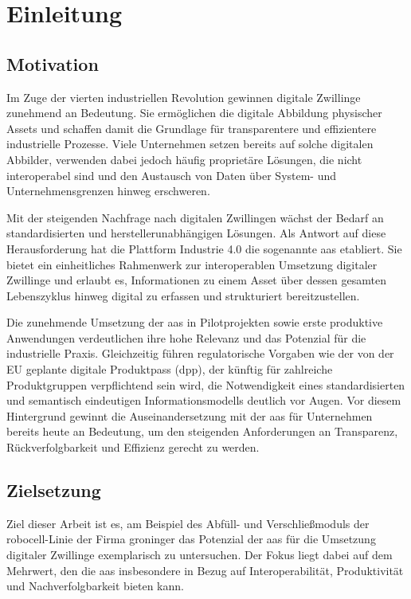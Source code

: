 \thispagestyle{fancy}
\section{Einleitung}
\subsection{Motivation}
\label{sec:Motivation}
Im Zuge der vierten industriellen Revolution gewinnen digitale Zwillinge zunehmend an Bedeutung. 
Sie ermöglichen die digitale Abbildung physischer Assets und schaffen damit die Grundlage für transparentere und effizientere industrielle Prozesse. 
Viele Unternehmen setzen bereits auf solche digitalen Abbilder, verwenden dabei jedoch häufig proprietäre Lösungen, die nicht interoperabel sind und den Austausch von Daten über System- und Unternehmensgrenzen hinweg erschweren.

Mit der steigenden Nachfrage nach digitalen Zwillingen wächst der Bedarf an standardisierten und herstellerunabhängigen Lösungen. 
Als Antwort auf diese Herausforderung hat die Plattform Industrie 4.0 die sogenannte \ac{aas} etabliert. 
Sie bietet ein einheitliches Rahmenwerk zur interoperablen Umsetzung digitaler Zwillinge und erlaubt es, Informationen zu einem Asset über dessen gesamten Lebenszyklus hinweg digital zu erfassen und strukturiert bereitzustellen.

Die zunehmende Umsetzung der \acs{aas} in Pilotprojekten sowie erste produktive Anwendungen verdeutlichen ihre hohe Relevanz und das Potenzial für die industrielle Praxis. 
Gleichzeitig führen regulatorische Vorgaben wie der von der EU geplante digitale Produktpass (\acs{dpp}), der künftig für zahlreiche Produktgruppen verpflichtend sein wird, die Notwendigkeit eines standardisierten und semantisch eindeutigen Informationsmodells deutlich vor Augen.
Vor diesem Hintergrund gewinnt die Auseinandersetzung mit der \acs{aas} für Unternehmen bereits heute an Bedeutung, um den steigenden Anforderungen an Transparenz, Rückverfolgbarkeit und Effizienz gerecht zu werden.

\subsection{Zielsetzung}

Ziel dieser Arbeit ist es, am Beispiel des Abfüll- und Verschließmoduls der robocell-Linie der Firma groninger das Potenzial der \acs{aas} für die Umsetzung digitaler Zwillinge exemplarisch zu untersuchen. 
Der Fokus liegt dabei auf dem Mehrwert, den die \acs{aas} insbesondere in Bezug auf Interoperabilität, Produktivität und Nachverfolgbarkeit bieten kann. 


